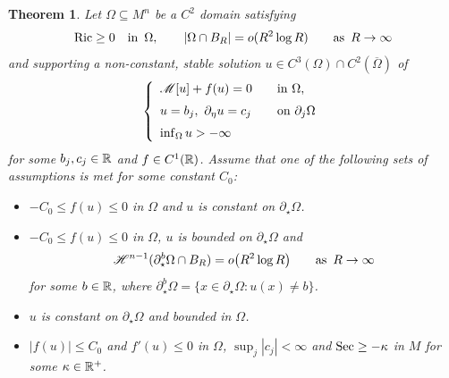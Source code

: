 \documentclass[10 pt,a4paper]{article}
\newtheorem{theorem}[definition]{Theorem}
\theoremstyle{definition}
\begin{document}
\begin{theorem}\label{teo_main_MC_manifolds}
	Let $\Omega \subseteq M^n$ be a $C^2$ domain satisfying
	\[
		\mathrm{Ric} \ge 0 \quad \text{in } \, \Omega, \qquad |\Omega \cap B_R| = o(R^2 \log R) \qquad \text{as } \, R \to \infty
	\]
	and supporting a non-constant, stable solution $u \in C^3(\Omega) \cap C^2(\overline\Omega)$ of 
	\begin{equation}\label{eq_PMC_cmc2}
		\left\{ 
		\begin{array}{ll}
			\mathscr{M}[u]  + f(u) = 0 & \quad\text{in } \Omega, \\[0.2cm]
			u = b_j, \ \partial_\eta u = c_j  & \quad \text{on $\partial_j \Omega$} \\[0.2cm]
			\inf_\Omega u > -\infty
		\end{array} \right.
	\end{equation}
	for some $b_j,c_j \in \mathbb R$ and $f \in C^1(\mathbb R)$. Assume that one of the following sets of assumptions is met for some constant $C_0$:
	\begin{itemize}
		\item[(A)] $- C_0 \le f(u) \le 0$ in $\Omega$ and $u$ is constant on $\partial_\star \Omega$.
		\item[(B)] $- C_0 \le f(u) \le 0$ in $\Omega$, $u$ is bounded on $\partial_\star \Omega$ and 
		\[
		\mathscr{H}^{n-1}(\partial_\star^{b}\Omega \cap B_R)= o \big(R^2 \log R\big) \qquad \text{as } \, R \to \infty
		\]
		for some $b \in \mathbb R$, where $\partial_\star^b\Omega=\{ x \in \partial_\star \Omega : u(x) \neq b\}$.
		\item[(C)] $u$ is constant on $\partial_\star \Omega$ and bounded in $\Omega$.
		\item[(D)] $|f(u)| \leq C_0$ and $f'(u) \le 0$ in $\Omega$, $\sup_j |c_j| < \infty$ and $\mathrm{Sec} \ge - \kappa$ in $M$ for some $\kappa \in \mathbb R^+$. 
	\end{itemize}			
%		
%	
%	
%	
%	

\end{theorem}
\end{document}
